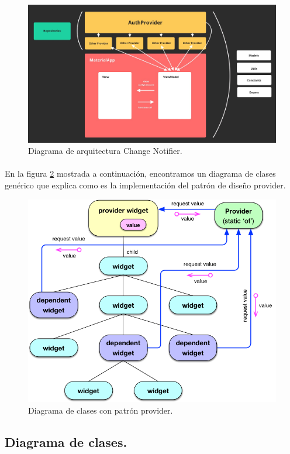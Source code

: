 \begin{figure}[H]
	\centering
	\includegraphics[width=0.85\linewidth]{figs/change-notifier}
	\caption[Arquitectura ChangeNotifier]{Diagrama de arquitectura Change Notifier.}
	\label{fig:ChangeNotifier}
\end{figure}

\paragraph{}En la figura \ref{fig:provider} mostrada a continuación, encontramos un
diagrama de clases genérico que explica como es la implementación del patrón de diseño
provider.

\begin{figure}[H]
	\centering
	\includegraphics[width=0.75\linewidth]{figs/provider-pattern}
	\caption[Patron Provider]{Diagrama de clases con patrón provider.}
	\label{fig:provider}
\end{figure}

\subsection{Diagrama de clases.}

